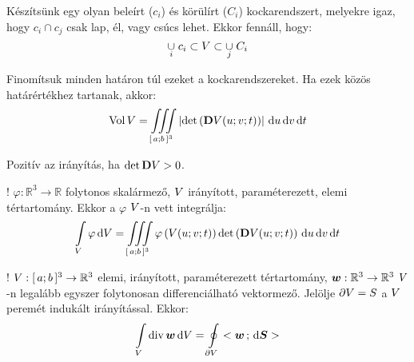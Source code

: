 \documentclass[main.tex]{subfiles}
\begin{document}

Készítsünk egy olyan beleírt ($c_i$) és körülírt ($C_i$)
kockarendszert, melyekre igaz, hogy $c_i \cap c_j$
csak lap, él, vagy csúcs lehet. Ekkor fennáll, hogy:
\begin{equation*}
  \underset{i}{\cup} \; c_i
  \subset {V} \subset
  \underset{j}{\cup} \; C_i
\end{equation*}

Finomítsuk minden határon túl ezeket a kockarendszereket.
Ha ezek közös határértékhez tartanak, akkor:
\begin{equation*}
  \operatorname{Vol} V = \iiint \limits_{[\, a; b \,]^3} \left|
  \det \left( \mathbf{D} {V}(u; v; t) \right)
  \right|
  \, \mathrm{d} u
  \, \mathrm{d} v
  \, \mathrm{d} t
\end{equation*}




Pozitív az irányítás, ha $\det \mathbf{D} {V} > 0$.




! $\varphi : \mathbb{R}^3 \rightarrow \mathbb{R}$ folytonos
skalármező, ${V}$ irányított, paraméterezett, elemi
tértartomány. Ekkor a $\varphi$ ${V}$-n vett integrálja:
\begin{equation*}
  \int \limits_{{V}} \varphi \, \mathrm{d} {V}
  =
  \iiint \limits_{[\, a; b \,]^3} \varphi \left(
  {V}(u; v; t)
  \right) \det \left(
  \mathbf{D} {V}(u; v; t)
  \right)
  \, \mathrm{d} u
  \, \mathrm{d} v
  \, \mathrm{d} t
\end{equation*}




! ${V} : [\, a; b \,]^3 \rightarrow \mathbb{R}^3$
elemi, irányított, paraméterezett tértartomány,
$\boldsymbol{w} : \mathbb{R}^3 \rightarrow \mathbb{R}^3$
${V}$-n legalább egyszer folytonosan differenciálható
vektormező. Jelölje $\partial {V} = {S}$
a ${V}$ peremét indukált irányítással. Ekkor:
\begin{equation*}
  \int \limits_{{V}} \operatorname{div} \boldsymbol{w} \, \mathrm{d} {V}
  =
  \oint \limits_{\partial {V}}
  < \boldsymbol{w} \, ; \, \mathrm{d} \boldsymbol{S} >
\end{equation*}
\end{document}
